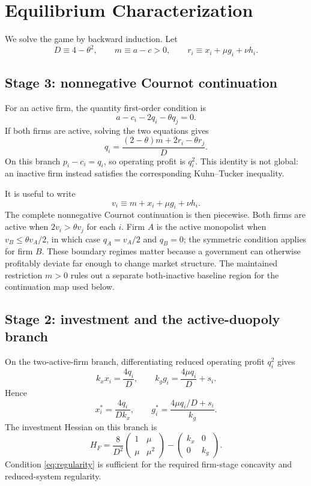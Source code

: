\section{Equilibrium Characterization}
\label{sec:equilibrium}

We solve the game by backward induction. Let
\begin{equation}
D\equiv4-\theta^2,
\qquad
m\equiv a-c>0,
\qquad
r_i\equiv x_i+\mu g_i+\nu h_i.
\end{equation}

\subsection{Stage 3: nonnegative Cournot continuation}

For an active firm, the quantity first-order condition is
\[
a-c_i-2q_i-\theta q_j=0.
\]
If both firms are active, solving the two equations gives
\begin{equation}
q_i
=\frac{(2-\theta)m+2r_i-\theta r_j}{D}.
\label{eq:cournot-output}
\end{equation}
On this branch $p_i-c_i=q_i$, so operating profit is $q_i^2$. This identity is not global: an inactive firm instead satisfies the corresponding Kuhn--Tucker inequality.

It is useful to write
\[
v_i\equiv m+x_i+\mu g_i+\nu h_i.
\]
The complete nonnegative Cournot continuation is then piecewise. Both firms are active when $2v_i>\theta v_j$ for each $i$. Firm $A$ is the active monopolist when $v_B\leq\theta v_A/2$, in which case $q_A=v_A/2$ and $q_B=0$; the symmetric condition applies for firm $B$. These boundary regimes matter because a government can otherwise profitably deviate far enough to change market structure. The maintained restriction $m>0$ rules out a separate both-inactive baseline region for the continuation map used below.

\subsection{Stage 2: investment and the active-duopoly branch}

On the two-active-firm branch, differentiating reduced operating profit $q_i^2$ gives
\begin{equation}
k_x x_i=\frac{4q_i}{D},
\qquad
k_g g_i=\frac{4\mu q_i}{D}+s_i.
\end{equation}
Hence
\begin{equation}
x_i^*=\frac{4q_i}{Dk_x},
\qquad
g_i^*=\frac{4\mu q_i/D+s_i}{k_g}.
\label{eq:investment-solutions}
\end{equation}
The investment Hessian on this branch is
\begin{equation}
H_F=
\frac{8}{D^2}
\begin{pmatrix}
1&\mu\\
\mu&\mu^2
\end{pmatrix}
-
\begin{pmatrix}k_x&0\\0&k_g\end{pmatrix}.
\label{eq:firm-hessian}
\end{equation}
Condition \eqref{eq:regularity} is sufficient for the required firm-stage concavity and reduced-system regularity.

